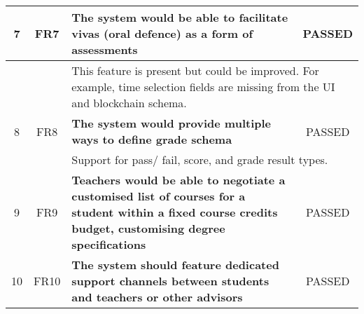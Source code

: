 \begin{table}[!ht]
\begin{tabularx}{\textwidth}{|c|c|X|c|}
		\hline
		7                                                                 & FR7                     & \textbf{The system would be able to facilitate vivas (oral defence) as a form of assessments}                                                         & \cellcolor{green}PASSED \\
		\hline
		                                                                  &                         & \multicolumn{2}{X|}{This feature is present but could be improved. For example, time selection fields are missing from the UI and blockchain schema.}                           \\
		\hline
		8                                                                 & FR8                     & \textbf{The system would provide multiple ways to define
		grade schema}                                                     & \cellcolor{green}PASSED                                                                                                                                                                                   \\
		\hline
		                                                                  &                         & \multicolumn{2}{X|}{Support for pass/ fail, score, and grade result types.}                                                                                                     \\
		\hline
		9                                                                 & FR9                     & \textbf{Teachers would be able to negotiate a customised list of courses for a student
		within a fixed course credits budget, customising degree specifications} & \cellcolor{green}PASSED                                                                                                                                                                                   \\
		\hline
		10                                                                & FR10                    & \textbf{The system should feature dedicated support channels
		between students and teachers or other advisors}                  & \cellcolor{green}PASSED                                                                                                                                                                                   \\

\end{tabularx}
\end{table}
